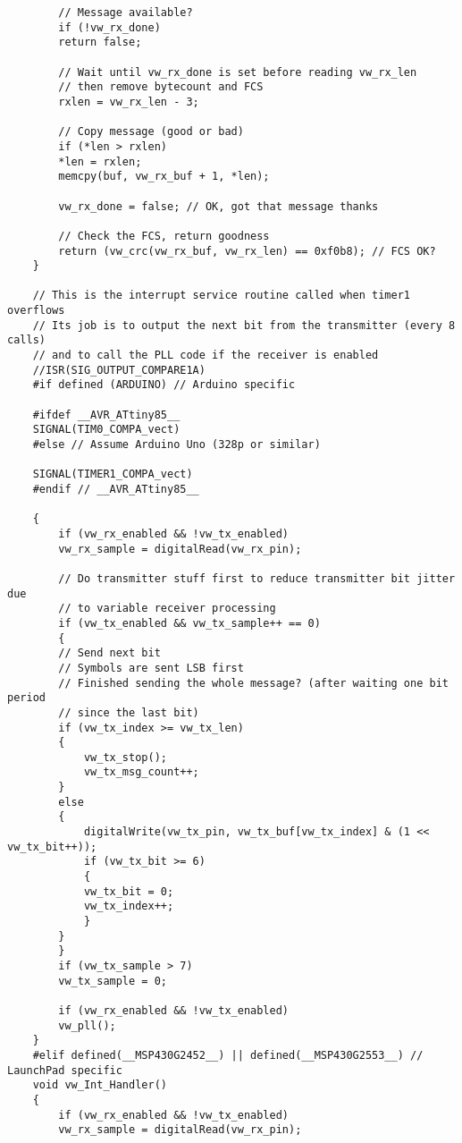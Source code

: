 \begin{verbatim}
        // Message available?
        if (!vw_rx_done)
        return false;
        
        // Wait until vw_rx_done is set before reading vw_rx_len
        // then remove bytecount and FCS
        rxlen = vw_rx_len - 3;
        
        // Copy message (good or bad)
        if (*len > rxlen)
        *len = rxlen;
        memcpy(buf, vw_rx_buf + 1, *len);
        
        vw_rx_done = false; // OK, got that message thanks
        
        // Check the FCS, return goodness
        return (vw_crc(vw_rx_buf, vw_rx_len) == 0xf0b8); // FCS OK?
    }

    // This is the interrupt service routine called when timer1 overflows
    // Its job is to output the next bit from the transmitter (every 8 calls)
    // and to call the PLL code if the receiver is enabled
    //ISR(SIG_OUTPUT_COMPARE1A)
    #if defined (ARDUINO) // Arduino specific

    #ifdef __AVR_ATtiny85__
    SIGNAL(TIM0_COMPA_vect)
    #else // Assume Arduino Uno (328p or similar)

    SIGNAL(TIMER1_COMPA_vect)
    #endif // __AVR_ATtiny85__

    {
        if (vw_rx_enabled && !vw_tx_enabled)
        vw_rx_sample = digitalRead(vw_rx_pin);
        
        // Do transmitter stuff first to reduce transmitter bit jitter due 
        // to variable receiver processing
        if (vw_tx_enabled && vw_tx_sample++ == 0)
        {
        // Send next bit
        // Symbols are sent LSB first
        // Finished sending the whole message? (after waiting one bit period 
        // since the last bit)
        if (vw_tx_index >= vw_tx_len)
        {
            vw_tx_stop();
            vw_tx_msg_count++;
        }
        else
        {
            digitalWrite(vw_tx_pin, vw_tx_buf[vw_tx_index] & (1 << vw_tx_bit++));
            if (vw_tx_bit >= 6)
            {
            vw_tx_bit = 0;
            vw_tx_index++;
            }
        }
        }
        if (vw_tx_sample > 7)
        vw_tx_sample = 0;
        
        if (vw_rx_enabled && !vw_tx_enabled)
        vw_pll();
    }
    #elif defined(__MSP430G2452__) || defined(__MSP430G2553__) // LaunchPad specific
    void vw_Int_Handler()
    {
        if (vw_rx_enabled && !vw_tx_enabled)
        vw_rx_sample = digitalRead(vw_rx_pin);
        

\end{verbatim}
